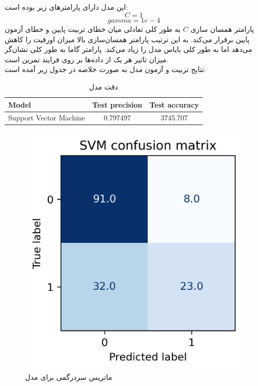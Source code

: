 \documentclass[11pt]{article}
\begin{document}
		\subsection{}
				این مدل دارای پارامترهای زیر بوده است:
		$$C = 1$$
		$$gamma = 1e-4$$
		پارامتر همسان سازی $C$ به طور کلی تعادلی میان خطای تربیت پایین و خطای آزمون پایین برقرار می‌کند. به این ترتیب پارامتر همسان‌سازی بالا میزان اورفیت را کاهش می‌دهد اما به طور کلی بایاس مدل را زیاد می‌کند. پارامتر گاما به طور کلی نشان‌گر میزان تاثیر هر یک از داده‌ها بر روی فرایند تمرین است.\\
		نتایج تربیت و آزمون مدل به صورت خلاصه در جدول زیر آمده است:
		\begin{table}[h!]
		\caption{دقت مدل }
			\begin{latin}
				\centering
				\begin{tabular}{|l|c|c|}
					\hline
					\textbf{Model} & \textbf{Test precision} & \textbf{Test accuracy} \\ \hline
					Support Vector Machine & 0.797497 & 3745.707 \\ \hline
				\end{tabular}
			\end{latin}
			\label{tab:svm_results}
		\end{table}
		\begin{figure}[!h]
			\centerline{\includegraphics[width=0.5\linewidth]{../HW2_2/SVM confusion.png}}
			\caption{ماتریس سردرگمی برای مدل }
			\label{fig:confusion_svm}
		\end{figure}
	\pagebreak
\end{document}
